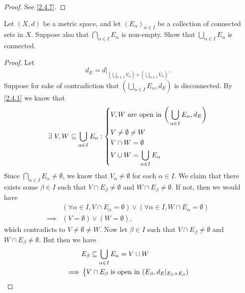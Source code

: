 \begin{proof}
  See \cref{2.4.7}.
\end{proof}

\begin{ex}\label{ex:2.4.6}
  Let \((X, d)\) be a metric space, and let \((E_\alpha)_{\alpha \in I}\) be a collection of connected sets in \(X\).
  Suppose also that \(\bigcap_{\alpha \in I} E_\alpha\) is non-empty.
  Show that \(\bigcup_{\alpha \in I} E_\alpha\) is connected.
\end{ex}

\begin{proof}
  Let
  \[
    d_E = d|_{(\bigcup_{\alpha \in I} V_\alpha) \times (\bigcup_{\alpha \in I} V_\alpha)}.
  \]
  Suppose for sake of contradiction that \((\bigcup_{\alpha \in I} E_\alpha, d_E)\) is disconnected.
  By \cref{2.4.1} we know that
  \[
    \exists\ V, W \subseteq \bigcup_{\alpha \in I} E_\alpha : \begin{dcases}
      V, W \text{ are open in } \bigg(\bigcup_{\alpha \in I} E_\alpha, d_E\bigg) \\
      V \neq \emptyset \neq W                                                    \\
      V \cap W = \emptyset                                                       \\
      V \cup W = \bigcup_{\alpha \in I} E_\alpha
    \end{dcases}
  \]
  Since \(\bigcap_{\alpha \in I} E_\alpha \neq \emptyset\), we know that \(V_\alpha \neq \emptyset\) for each \(\alpha \in I\).
  We claim that there exists some \(\beta \in I\) such that \(V \cap E_\beta \neq \emptyset\) and \(W \cap E_\beta \neq \emptyset\).
  If not, then we would have
  \begin{align*}
             & (\forall \alpha \in I, V \cap E_\alpha = \emptyset) \lor (\forall \alpha \in I, W \cap E_\alpha = \emptyset) \\
    \implies & (V = \emptyset) \lor (W = \emptyset),
  \end{align*}
  which contradicts to \(V \neq \emptyset \neq W\).
  Now let \(\beta \in I\) such that \(V \cap E_\beta \neq \emptyset\) and \(W \cap E_\beta \neq \emptyset\).
  But then we have
  \begin{align*}
             & E_\beta \subseteq \bigcup_{\alpha \in I} E_\alpha = V \cup W                                   \\
    \implies & \begin{dcases}
                 V \cap E_\beta \text{ is open in } (E_\beta, d_E|_{E_\beta \times E_\beta}) \\

\end{dcases}
\end{align*}
\end{proof}
